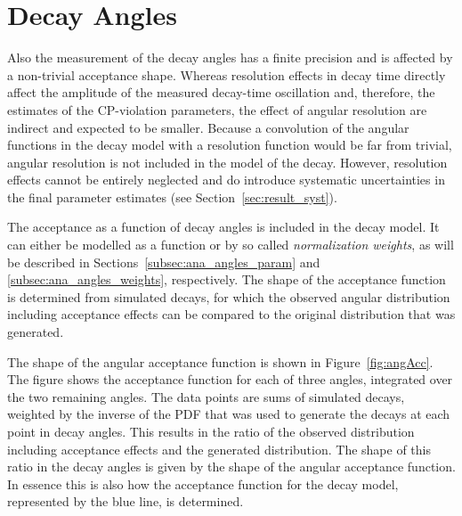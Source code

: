 \section{Decay Angles}
\label{sec:ana_angles}

Also the measurement of the decay angles has a finite precision and is affected by a non-trivial acceptance shape. Whereas resolution
effects in decay time directly affect the amplitude of the measured decay-time oscillation and, therefore, the estimates of the
CP-violation parameters, the effect of angular resolution are indirect and expected to be smaller. Because a convolution of the angular
functions in the decay model with a resolution function would be far from trivial, angular resolution is not included in the model of the
decay. However, resolution effects cannot be entirely neglected and do introduce systematic uncertainties in the final parameter estimates
(see Section~\ref{sec:result_syst}).

The acceptance as a function of decay angles is included in the decay model. It can either be modelled as a function or by so called
\emph{normalization weights}, as will be described in Sections~\ref{subsec:ana_angles_param} and \ref{subsec:ana_angles_weights},
respectively. The shape of the acceptance function is determined from simulated decays, for which the observed angular distribution
including acceptance effects can be compared to the original distribution that was generated.

The shape of the angular acceptance function is shown in Figure~\ref{fig:angAcc}. The figure shows the acceptance function for each of
three angles, integrated over the two remaining angles. The data points are sums of simulated decays, weighted by the inverse of the PDF
that was used to generate the decays at each point in decay angles. This results in the ratio of the observed distribution including
acceptance effects and the generated distribution. The shape of this ratio in the decay angles is given by the shape of the angular
acceptance function. In essence this is also how the acceptance function for the decay model, represented by the blue line, is determined.

